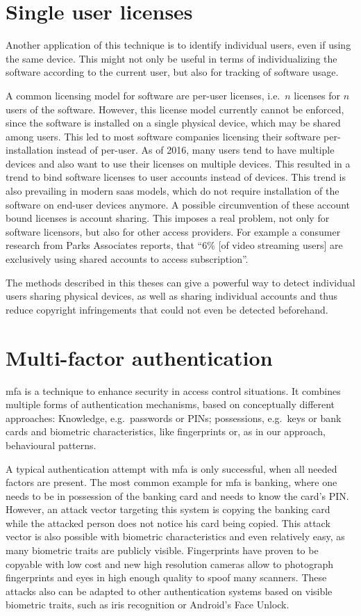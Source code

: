 \section{Single user licenses}
Another application of this technique is to identify individual users, even if using the same device. This might not only be useful in terms of individualizing the software according to the current user, but also for tracking of software usage.

A common licensing model for software are per-user licenses, i.e.\ $n$ licenses for $n$ users of the software. However, this license model currently cannot be enforced, since the software is installed on a single physical device, which may be shared among users. This led to most software companies licensing their software per-installation instead of per-user.
As of 2016, many users tend to have multiple devices and also want to use their licenses on multiple devices. This resulted in a trend to bind software licenses to user accounts instead of devices. This trend is also prevailing in modern \gls{saas} models, which do not require installation of the software on end-user devices anymore.
A possible circumvention of these account bound licenses is account sharing. This imposes a real problem, not only for software licensors, but also for other access providers. For example a consumer research from Parks Associates\cite{accountsharing} reports, that ``6\% [of video streaming users] are exclusively using shared accounts to access subscription''. 

The methods described in this theses can give a powerful way to detect individual users sharing physical devices, as well as sharing individual accounts and thus reduce copyright infringements that could not even be detected beforehand.

\section{Multi-factor authentication}
\gls{mfa} is a technique to enhance security in access control situations. It combines multiple forms of authentication mechanisms, based on conceptually different approaches: Knowledge, e.g.\ passwords or PINs; possessions, e.g.\ keys or bank cards and biometric characteristics, like fingerprints or, as in our approach, behavioural patterns.

A typical authentication attempt with \gls{mfa} is only successful, when all needed factors are present. The most common example for \gls{mfa} is banking, where one needs to be in possession of the banking card and needs to know the card's PIN. However, an attack vector targeting this system is copying the banking card while the attacked person does not notice his card being copied. This attack vector is also possible with biometric characteristics and even relatively easy, as many biometric traits are publicly visible. Fingerprints have proven to be copyable with low cost\cite{starbug2008bastel} and new high resolution cameras allow to photograph fingerprints and eyes in high enough quality to spoof many scanners\cite{fiebig2014security}. These attacks also can be adapted to other authentication systems based on visible biometric traits, such as iris recognition or Android's Face Unlock.

